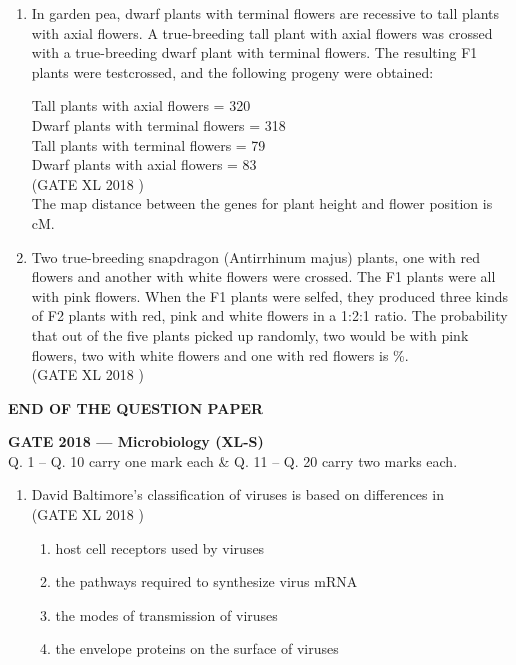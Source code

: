 \documentclass[14pt]{extarticle}
\begin{document}
\begin{flushleft}
\begin{enumerate}[leftmargin=*]
    \item In garden pea, dwarf plants with terminal flowers are recessive to tall plants with axial flowers. A true-breeding tall plant with axial flowers was crossed with a true-breeding dwarf plant with terminal flowers. The resulting F1 plants were testcrossed, and the following progeny were obtained:  

    Tall plants with axial flowers = 320 \\
    Dwarf plants with terminal flowers = 318 \\
    Tall plants with terminal flowers = 79 \\
    Dwarf plants with axial flowers = 83  \\
    \hfill(GATE XL 2018 )\\
    The map distance between the genes for plant height and flower position is \underline{\hspace{3cm}} cM.

    \item Two true-breeding snapdragon (Antirrhinum majus) plants, one with red flowers and another with white flowers were crossed. The F1 plants were all with pink flowers. When the F1 plants were selfed, they produced three kinds of F2 plants with red, pink and white flowers in a 1:2:1 ratio. The probability that out of the five plants picked up randomly, two would be with pink flowers, two with white flowers and one with red flowers is \underline{\hspace{3cm}} \%.\\
    \hfill(GATE XL 2018 )
\end{enumerate}
\begin{center}
    \textbf{END OF THE QUESTION PAPER}
\end{center}
\clearpage

\begin{center}
 \textbf{\large{GATE 2018 — Microbiology (XL-S)}}\\[6pt]
 Q. 1 -- Q. 10 carry one mark each \& Q. 11 -- Q. 20 carry two marks each.\\[12pt]
\end{center}

\begin{enumerate}

\item David Baltimore’s classification of viruses is based on differences in\\
\hfill(GATE XL 2018 )\\
\begin{enumerate}[label=(\Alph*)]
  \item host cell receptors used by viruses
  \item the pathways required to synthesize virus mRNA
  \item the modes of transmission of viruses
  \item the envelope proteins on the surface of viruses
\end{enumerate}


\end{enumerate}
\end{flushleft}
\end{document}
